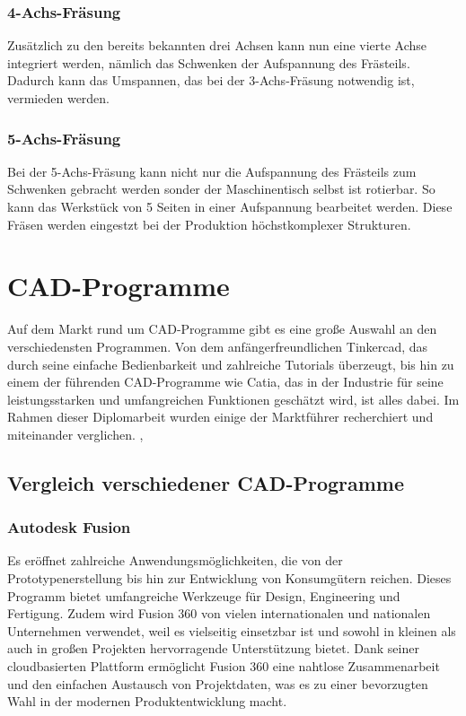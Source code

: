 \subsubsection{4-Achs-Fräsung}
Zusätzlich zu den bereits bekannten drei Achsen kann nun eine vierte Achse integriert werden, nämlich das Schwenken der Aufspannung des Frästeils. Dadurch kann das Umspannen, das bei der 3-Achs-Fräsung notwendig ist, vermieden werden.

\subsubsection{5-Achs-Fräsung}
Bei der 5-Achs-Fräsung kann nicht nur die Aufspannung des Frästeils zum Schwenken gebracht werden sonder der Maschinentisch selbst ist rotierbar. So kann das Werkstück von 5 Seiten in einer Aufspannung bearbeitet werden. Diese Fräsen werden eingestzt bei der Produktion höchstkomplexer Strukturen.

\cite{Fräsen-3/4/5-Achs}


\section{CAD-Programme}
Auf dem Markt rund um CAD-Programme gibt es eine große Auswahl an den verschiedensten Programmen. Von dem anfängerfreundlichen Tinkercad, das durch seine einfache Bedienbarkeit und zahlreiche Tutorials überzeugt, bis hin zu einem der führenden CAD-Programme wie Catia, das in der Industrie für seine leistungsstarken und umfangreichen Funktionen geschätzt wird, ist alles dabei. Im Rahmen dieser Diplomarbeit wurden einige der Marktführer recherchiert und miteinander verglichen.
\cite{CAD-Programme}, \cite{3D-Printing-Software}

\subsection{Vergleich verschiedener CAD-Programme}

\subsubsection{Autodesk Fusion}
Es eröffnet zahlreiche Anwendungsmöglichkeiten, die von der Prototypenerstellung bis hin zur Entwicklung von Konsumgütern reichen. Dieses Programm bietet umfangreiche Werkzeuge für Design, Engineering und Fertigung. Zudem wird Fusion 360 von vielen internationalen und nationalen Unternehmen verwendet, weil es vielseitig einsetzbar ist und sowohl in kleinen als auch in großen Projekten hervorragende Unterstützung bietet. Dank seiner cloudbasierten Plattform ermöglicht Fusion 360 eine nahtlose Zusammenarbeit und den einfachen Austausch von Projektdaten, was es zu einer bevorzugten Wahl in der modernen Produktentwicklung macht. 
\cite{AutodeskFusion}

